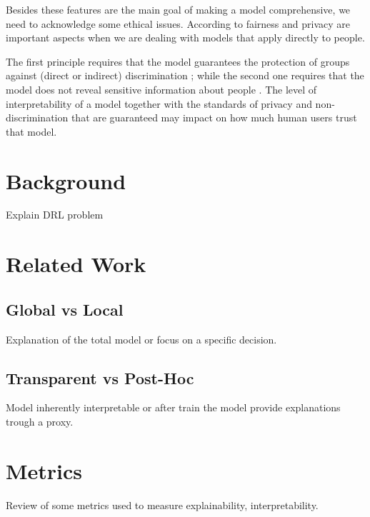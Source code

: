 \documentclass[runningheads]{llncs}
\begin{document}
Besides these features are the main goal of making a model comprehensive, we need to acknowledge some ethical issues. According to \cite{Andrews1995} \cite{Doshi-velez2017} fairness and privacy are important aspects when we are dealing with models that apply directly to people.

The first principle requires that the model guarantees the protection of groups against (direct or indirect) discrimination \cite{romei2014multidisciplinary}; while the second one requires that the model does not reveal sensitive information about people \cite{aldeen2015comprehensive}. The level of interpretability of a model together with the standards of privacy and non-discrimination that are guaranteed may impact on how much human users trust that model.\cite{Guidotti2018}


\section{Background}
Explain DRL problem 

\section{Related Work}

\subsection{Global vs Local }
Explanation of the total model or focus on a specific decision.

\subsection{Transparent vs Post-Hoc }
Model inherently interpretable or after train the model provide explanations trough a proxy.

\section{Metrics}
Review of some metrics used to measure explainability, interpretability.
\end{document}

